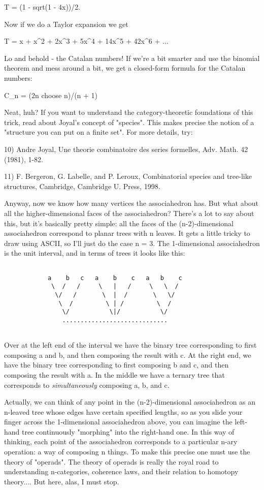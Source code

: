 T = (1 - sqrt(1 - 4x))/2.

Now if we do a Taylor expansion we get

T = x + x^{2} + 2x^{3} + 5x^{4} + 14x^{5} 
+ 42x^{6} + ...

Lo and behold - the Catalan numbers!  If we're a bit smarter and use 
the binomial theorem and mess around a bit, we get a closed-form 
formula for the Catalan numbers:

C_{n} = (2n choose n)/(n + 1)

Neat, huh?   If you want to understand the category-theoretic 
foundations of this trick, read about Joyal's concept of "species".
This makes precise the notion of a "structure you can put on a 
finite set".  For more details, try:

10) Andre Joyal, Une theorie combinatoire des series formelles, 
Adv. Math. 42 (1981), 1-82.

11) F. Bergeron, G. Labelle, and P. Leroux, Combinatorial species 
and tree-like structures, Cambridge, Cambridge U. Press, 1998.

Anyway, now we know how many vertices the associahedron has.  But
what about all the higher-dimensional faces of the associahedron?
There's a lot to say about this, but it's basically pretty simple:
all the faces of the (n-2)-dimensional associahedron correspond 
to planar trees with n leaves.   It gets a little tricky to draw
using ASCII, so I'll just do the case n = 3.  The 1-dimensional
associahedron is the unit interval, and in terms of trees it looks
like this:


\begin{verbatim}

            a    b   c   a    b    c   a   b    c
             \  /   /     \   |   /     \   \  / 
              \/   /       \  |  /       \   \/ 
               \  /         \ | /         \  /
                \/           \|/           \/
                .............................
 
\end{verbatim}
    
Over at the left end of the interval we have the binary tree 
corresponding to first composing a and b, and then composing the 
result with c.   At the right end, we have the binary tree 
corresponding to first composing b and c, and then composing the
result with a.  In the middle we have a ternary tree that 
corresponds to \emph{simultaneously} composing a, b, and c.

Actually, we can think of any point in the (n-2)-dimensional
associahedron as an n-leaved tree whose edges have certain specified
lengths, so as you slide your finger across the 1-dimensional
associahedron above, you can imagine the left-hand tree continuously
"morphing" into the right-hand one.  In this way of thinking,
each point of the associahedron corresponds to a particular n-ary
operation: a way of composing n things.  To make this precise one must
use the theory of "operads".  The theory of operads is really
the royal road to understanding n-categories, coherence laws, and their
relation to homotopy theory....  But here, alas, I must stop.

